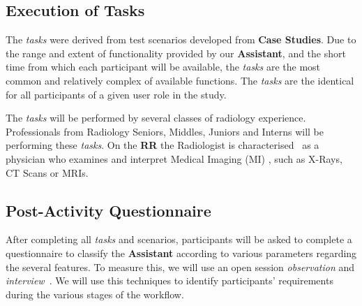 
\subsection{Execution of Tasks}

The \textit{tasks} were derived from test scenarios developed from \textbf{Case Studies}. Due to the range and extent of functionality provided by our \textbf{Assistant}, and the short time from which each participant will be available, the \textit{tasks} are the most common and relatively complex of available functions. The \textit{tasks} are the identical for all participants of a given user role in the study.

The \textit{tasks} will be performed by several classes of radiology experience. Professionals from Radiology Seniors, Middles, Juniors and Interns will be performing these \textit{tasks}. On the \textbf{RR} the Radiologist is characterised~\cite{ehrlich2016patient, miglioretti2007radiologist} as a physician who examines and interpret Medical Imaging (MI) \cite{kobashi2017evaluation}, such as X-Rays, CT Scans or MRIs.



\subsection{Post-Activity Questionnaire}

After completing all \textit{tasks} and scenarios, participants will be asked to complete a questionnaire to classify the \textbf{Assistant} according to various parameters regarding the several features. To measure this, we will use an open session \textit{observation} and \textit{interview}~\cite{carayon2015systematic}. We will use this techniques to identify participants' requirements during the various stages of the workflow.













